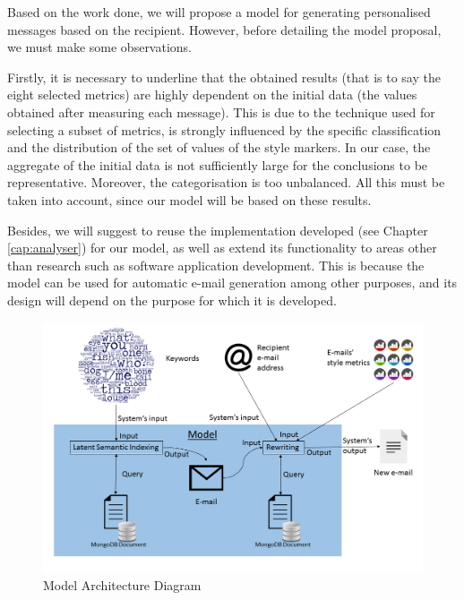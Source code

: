 Based on the work done, we will propose a model for generating personalised messages based on the recipient. However, before detailing the model proposal, we must make some observations.

Firstly, it is necessary to underline that the obtained results (that is to say the eight selected metrics) are highly dependent on the initial data (the values obtained after measuring each message). This is due to the technique used for selecting a subset of metrics, is strongly influenced by the specific classification and the distribution of the set of values of the style markers. In our case, the aggregate of the initial data is not sufficiently large for the conclusions to be representative. Moreover, the categorisation is too unbalanced. All this must be taken into account, since our model will be based on these results.

Besides, we will suggest to reuse the implementation developed (see Chapter \ref{cap:analyser}) for our model, as well as extend its functionality to areas other than research such as software application development. This is because the model can be used for automatic e-mail generation among other purposes, and its design will depend on the purpose for which it is developed.

\begin{figure}
	\centering%
	\centerline{\includegraphics[width = \textwidth]{Imagenes/Bitmap/model.png}}%
	\caption{Model Architecture Diagram}%
	\label{fig:modarch}
\end{figure}


